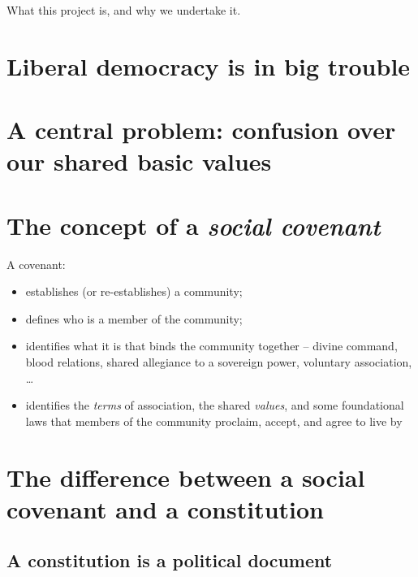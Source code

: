 \documentclass[
]{book}
\providecommand{\tightlist}{%
  \setlength{\itemsep}{0pt}\setlength{\parskip}{0pt}}
\begin{document}
What this project is, and why we undertake it.

\hypertarget{liberal-democracy-is-in-big-trouble}{%
\section{Liberal democracy is in big trouble}\label{liberal-democracy-is-in-big-trouble}}

\hypertarget{a-central-problem-confusion-over-our-shared-basic-values}{%
\section{A central problem: confusion over our shared basic values}\label{a-central-problem-confusion-over-our-shared-basic-values}}

\hypertarget{the-concept-of-a-social-covenant}{%
\section{\texorpdfstring{The concept of a \emph{social covenant}}{The concept of a social covenant}}\label{the-concept-of-a-social-covenant}}

A covenant:

\begin{itemize}
\tightlist
\item
  establishes (or re-establishes) a community;
\item
  defines who is a member of the community;
\item
  identifies what it is that binds the community together -- divine command, blood relations, shared allegiance to a sovereign power, voluntary association, \ldots{}
\item
  identifies the \emph{terms} of association, the shared \emph{values}, and some foundational laws that members of the community proclaim, accept, and agree to live by
\end{itemize}

\hypertarget{the-difference-between-a-social-covenant-and-a-constitution}{%
\section{The difference between a social covenant and a constitution}\label{the-difference-between-a-social-covenant-and-a-constitution}}

\hypertarget{a-constitution-is-a-political-document}{%
\subsection{A constitution is a political document}\label{a-constitution-is-a-political-document}}
\end{document}
